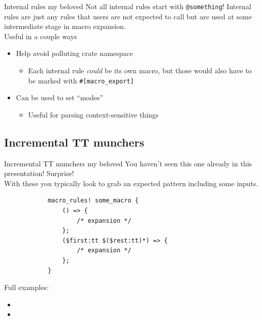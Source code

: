 \documentclass{beamer}
\begin{document}
	\begin{frame}{Internal rules my beloved}
		Not all internal rules start with \texttt{@something}! Internal rules are just any rules
		that users are not expected to call but are used at some intermediate stage in macro
		expansion. \\

		Useful in a couple ways
		\begin{itemize}
			\item Help avoid polluting crate namespace
			\begin{itemize}
				\item Each internal rule \emph{could} be its own macro, but those would also have to
					be marked with \texttt{\#[macro\_export]}
			\end{itemize}

			\item Can be used to set ``modes''
			\begin{itemize}
				\item Useful for parsing context-sensitive things
			\end{itemize}
		\end{itemize}
	\end{frame}

	\subsection{Incremental TT munchers}
	\begin{frame}[fragile]{Incremental TT munchers my beloved}
		You haven't seen this one already in this presentation! Surprise! \\

		With these you typically look to grab an expected pattern including some inputs.

		\begin{verbatim}
			macro_rules! some_macro {
				() => {
					/* expansion */
				};
				($first:tt $($rest:tt)*) => {
					/* expansion */
				};
			}
		\end{verbatim}

		Full examples:
		\begin{itemize}
			\item {}
			\item {}
		\end{itemize}
	\end{frame}
\end{document}
